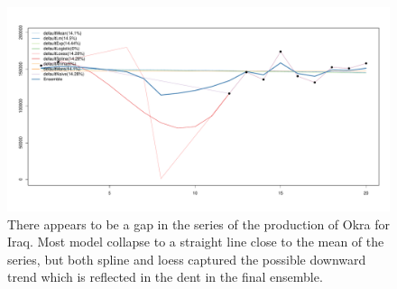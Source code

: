 \documentclass[nojss]{jss}\usepackage[]{graphicx}\usepackage[]{color}
\makeatletter
\def\maxwidth{ %
  \ifdim\Gin@nat@width>\linewidth
    \linewidth
  \else
    \Gin@nat@width
  \fi
}
\newenvironment{knitrout}{}{} %
\makeatother
\begin{document}
\begin{knitrout}
\color{fgcolor}\begin{figure}[!ht]


{\centering \includegraphics[width=\maxwidth]{figure/okra-ghana} 

}

\caption[There appears to be a gap in the series of the production of Okra for Iraq]{There appears to be a gap in the series of the production of Okra for Iraq. Most model collapse to a straight line close to the mean of the series, but both spline and loess captured the possible downward trend which is reflected in the dent in the final ensemble. \label{fig:okra-ghana}}
\end{figure}


\end{knitrout}
\end{document}
